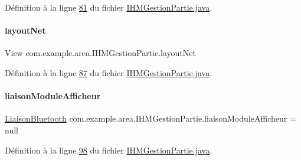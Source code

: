 Définition à la ligne \hyperlink{_i_h_m_gestion_partie_8java_source_l00081}{81} du fichier \hyperlink{_i_h_m_gestion_partie_8java_source}{I\+H\+M\+Gestion\+Partie.\+java}.

\mbox{\label{classcom_1_1example_1_1area_1_1_i_h_m_gestion_partie_ae9b9e3bd68c744139fe5b2300528beab}} 
\paragraph{\texorpdfstring{layout\+Net}{layoutNet}}
{\footnotesize\ttfamily View com.\+example.\+area.\+I\+H\+M\+Gestion\+Partie.\+layout\+Net\hspace{0.3cm}{\ttfamily [private]}}



Définition à la ligne \hyperlink{_i_h_m_gestion_partie_8java_source_l00087}{87} du fichier \hyperlink{_i_h_m_gestion_partie_8java_source}{I\+H\+M\+Gestion\+Partie.\+java}.

\mbox{\label{classcom_1_1example_1_1area_1_1_i_h_m_gestion_partie_a126a48e2f28ff098e20f0efb4700145f}} 
\paragraph{\texorpdfstring{liaison\+Module\+Afficheur}{liaisonModuleAfficheur}}
{\footnotesize\ttfamily \hyperlink{classcom_1_1example_1_1area_1_1_liaison_bluetooth}{Liaison\+Bluetooth} com.\+example.\+area.\+I\+H\+M\+Gestion\+Partie.\+liaison\+Module\+Afficheur = null\hspace{0.3cm}{\ttfamily [private]}}



Définition à la ligne \hyperlink{_i_h_m_gestion_partie_8java_source_l00098}{98} du fichier \hyperlink{_i_h_m_gestion_partie_8java_source}{I\+H\+M\+Gestion\+Partie.\+java}.

